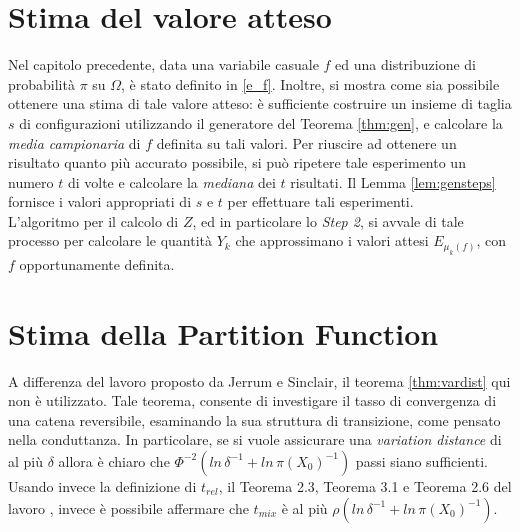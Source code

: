 \section{Stima del valore atteso}
Nel capitolo precedente, data una variabile casuale $f$ ed una distribuzione di probabilità $\pi$ su $\Omega$, è stato definito in \ref{e_f}. Inoltre, si mostra come sia possibile ottenere una stima di tale valore atteso: è sufficiente costruire un insieme di taglia $s$ di configurazioni utilizzando il generatore del Teorema \ref{thm:gen}, e calcolare la \textit{media campionaria} di $f$ definita su tali valori. Per riuscire ad ottenere un risultato quanto più accurato possibile, si può ripetere tale esperimento un numero $t$ di volte e calcolare la \textit{mediana} dei $t$ risultati. Il Lemma \ref{lem:gensteps} fornisce i valori appropriati di $s$ e $t$ per effettuare tali esperimenti.\\
L'algoritmo per il calcolo di $Z$, ed in particolare lo \textit{Step 2}, si avvale di tale processo per calcolare le quantità $Y_k$ che approssimano i valori attesi $E_{\mu_k(f)}$, con $f$ opportunamente definita.

\section{Stima della Partition Function}\label{sec:mypf}
A differenza del lavoro proposto da Jerrum e Sinclair, il teorema \ref{thm:vardist} qui non è utilizzato. Tale teorema, consente di investigare il tasso di convergenza di una catena reversibile, esaminando la sua struttura di transizione, come pensato nella conduttanza. In particolare, se si vuole assicurare una \textit{variation distance} di al più $\delta$ allora è chiaro che $\Phi^{-2}(ln\,\delta^{-1} + ln\,\pi(X_0)^{-1})$ passi siano sufficienti.\\
Usando invece la definizione di $t_{rel}$, il Teorema 2.3, Teorema 3.1 e Teorema 2.6 del lavoro \cite{auletta2011convergence}, invece è possibile affermare che $t_{mix}$ è al più $\rho(ln\,\delta^{-1} + ln\,\pi(X_0)^{-1})$.\\
